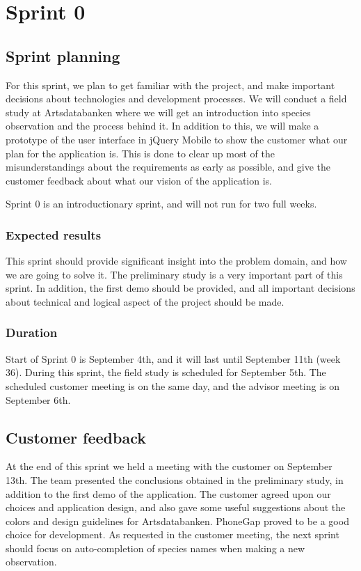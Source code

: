 \section{Sprint 0}

\subsection{Sprint planning}
For this sprint, we plan to get familiar with the project, and make important
decisions about technologies and development processes. We will conduct a field
study at Artsdatabanken where we will get an introduction into species
observation and the process behind it. In addition to this, we will make a
prototype of the user interface in jQuery Mobile to show the customer what our
plan for the application is. This is done to clear up most of the
misunderstandings about the requirements as early as possible, and give the
customer feedback about what our vision of the application is. 

Sprint 0 is an introductionary sprint, and will not run for two full weeks.

\subsubsection{Expected results}
This sprint should provide significant
insight into the problem domain, and how we are going to solve it. The
preliminary study is a very important part of this sprint. In addition, the
first demo should be provided, and all important decisions about technical and
logical aspect of the project should be made.

\subsubsection{Duration}
Start of Sprint 0 is September 4th, and it will last
until September 11th (week 36). During this sprint, the field study is
scheduled for September 5th. The scheduled customer meeting is on the same
day, and the advisor meeting is on September 6th.



\subsection{Customer feedback}
At the end of this sprint we held a meeting with
the customer on September 13th. The team presented the conclusions obtained in
the preliminary study, in addition to the first demo of the application. The
customer agreed upon our choices and application design, and also gave some
useful suggestions about the colors and design guidelines for Artsdatabanken.
PhoneGap proved to be a good choice for development.  As requested in the
customer meeting, the next sprint should focus on auto-completion of species
names when making a new observation.

